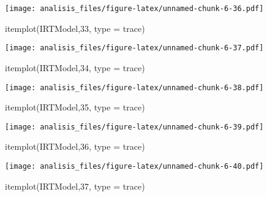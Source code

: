 \documentclass[
]{article}
\newenvironment{Shaded}{\begin{snugshade}}{\end{snugshade}}
\newcommand{\AttributeTok}[1]{\textcolor[rgb]{0.77,0.63,0.00}{#1}}
\newcommand{\DecValTok}[1]{\textcolor[rgb]{0.00,0.00,0.81}{#1}}
\newcommand{\FunctionTok}[1]{\textcolor[rgb]{0.00,0.00,0.00}{#1}}
\newcommand{\NormalTok}[1]{#1}
\newcommand{\StringTok}[1]{\textcolor[rgb]{0.31,0.60,0.02}{#1}}
\begin{document}
\texttt{[image: analisis\_files/figure-latex/unnamed-chunk-6-36.pdf]}

\begin{Shaded}
\begin{Highlighting}[]
\FunctionTok{itemplot}\NormalTok{(IRTModel,}\DecValTok{33}\NormalTok{, }\AttributeTok{type =} \StringTok{\textquotesingle{}trace\textquotesingle{}}\NormalTok{)}
\end{Highlighting}
\end{Shaded}

\texttt{[image: analisis\_files/figure-latex/unnamed-chunk-6-37.pdf]}

\begin{Shaded}
\begin{Highlighting}[]
\FunctionTok{itemplot}\NormalTok{(IRTModel,}\DecValTok{34}\NormalTok{, }\AttributeTok{type =} \StringTok{\textquotesingle{}trace\textquotesingle{}}\NormalTok{)}
\end{Highlighting}
\end{Shaded}

\texttt{[image: analisis\_files/figure-latex/unnamed-chunk-6-38.pdf]}

\begin{Shaded}
\begin{Highlighting}[]
\FunctionTok{itemplot}\NormalTok{(IRTModel,}\DecValTok{35}\NormalTok{, }\AttributeTok{type =} \StringTok{\textquotesingle{}trace\textquotesingle{}}\NormalTok{)}
\end{Highlighting}
\end{Shaded}

\texttt{[image: analisis\_files/figure-latex/unnamed-chunk-6-39.pdf]}

\begin{Shaded}
\begin{Highlighting}[]
\FunctionTok{itemplot}\NormalTok{(IRTModel,}\DecValTok{36}\NormalTok{, }\AttributeTok{type =} \StringTok{\textquotesingle{}trace\textquotesingle{}}\NormalTok{)}
\end{Highlighting}
\end{Shaded}

\texttt{[image: analisis\_files/figure-latex/unnamed-chunk-6-40.pdf]}

\begin{Shaded}
\begin{Highlighting}[]
\FunctionTok{itemplot}\NormalTok{(IRTModel,}\DecValTok{37}\NormalTok{, }\AttributeTok{type =} \StringTok{\textquotesingle{}trace\textquotesingle{}}\NormalTok{)}
\end{Highlighting}
\end{Shaded}
\end{document}
